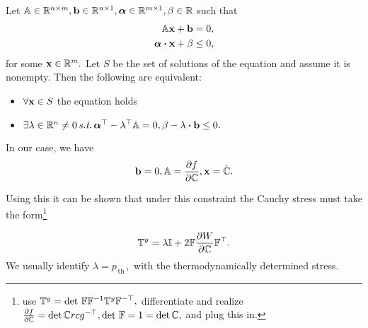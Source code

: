 \documentclass[reqno, a4paper]{article}
\begin{document}
\begin{theorem}
Let $\mathbb{A} \in {\mathbb R}^{n \times m}, \vb{b} \in {\mathbb R}^{n \times 1}, \vb*{\alpha}\in {\mathbb R}^{m \times 1}, \beta \in {\mathbb R}$ such that
\begin{align*}
	\tensorq{A}\vb{x}+\vb{b} &= 0, \\
	\vb*{\alpha}\vdot \vb{x} + \beta &\leq 0,
\end{align*}
for some $\vb{x} \in {\mathbb R}^{m}.$
    Let $S$ be the set of solutions of the equation and assume it is nonempty. Then the following are equivalent:
\begin{itemize}
	\item $\forall \vb{x} \in S$ the equation holds
	\item $\exists \lambda \in \R^n \neq 0 \, \text{\textit{s.t.}} \, \transpose{\vb*{\alpha}}- \transpose{\lambda}\tensorq{A} =0, \beta - \lambda \vdot \vb{b} \leq 0.$
\end{itemize}
\end{theorem}

\begin{remark}
	In our case, we have
	\[
		\vb{b} =0, \mathbb{A} = \pdv{f}{\ensuremath{\mathbb{C}}}, \vb{x} = \dot{\mathbb{C}}.
	\]
\end{remark}

Using this it can be shown that under this constraint the Cauchy stress must take the form\footnote{use $\mathbb{T}^y = \det\, \mathbb{F} \mathbb{F}^{-1} \mathbb{T}^y \mathbb{F}^{-\top},$ differentiate and realize $\pdv{f}{\ensuremath{\mathbb{C}}} = \det \mathbb{C} rcg^{-\top}, \det\, \mathbb{F} = 1 = \det \mathbb{C},$ and plug this in.}

\[
	\mathbb{T}^y = \lambda \mathbb{I} + 2 \mathbb{F} \pdv{W}{\ensuremath{\mathbb{C}}} \mathbb{F}^\top.
\]
We usually identify $\lambda = p_{\, \text{th} \,},$ with the thermodynamically determined stress.
\end{document}
